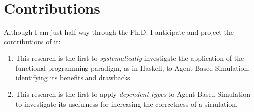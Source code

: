 \section{Contributions}
Although I am just half-way through the Ph.D. I anticipate and project the contributions of it:

\begin{enumerate}
	\item This research is the first to \textit{systematically} investigate the application of the functional programming paradigm, as in Haskell, to Agent-Based Simulation, identifying its benefits and drawbacks.
	\item This research is the first to apply \textit{dependent types} to Agent-Based Simulation to investigate its usefulness for increasing the correctness of a simulation.
\end{enumerate}